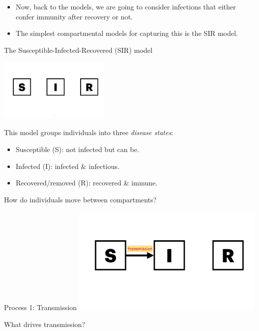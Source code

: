 \documentclass[
  ignorenonframetext,
]{beamer}
\providecommand{\tightlist}{%
  \setlength{\itemsep}{0pt}\setlength{\parskip}{0pt}}\usepackage{longtable,booktabs,array}
\begin{document}
\begin{frame}
\begin{itemize}
\tightlist
\item
  Now, back to the models, we are going to consider infections that
  either confer immunity after recovery or not.
\item
  The simplest compartmental models for capturing this is the SIR model.
\end{itemize}
\end{frame}

\begin{frame}
\begin{block}{The Susceptible-Infected-Recovered (SIR) model}
\label{the-susceptible-infected-recovered-sir-model}
\begin{center}
\includegraphics[width=0.4\textwidth,height=\textheight]{./images/model_diagrams/model_diagrams.001.jpeg}
\end{center}

This model groups individuals into three \emph{disease states}:

\begin{itemize}
\item
  {Susceptible (S)}: not infected but can be.
\item
  {Infected (I)}: infected \& infectious.
\item
  {Recovered/removed (R)}: recovered \& immune.
\end{itemize}
\end{block}
\end{frame}

\begin{frame}
\begin{block}{How do individuals move between compartments?}
\label{how-do-individuals-move-between-compartments}
\begin{block}{Process 1: Transmission}
\label{process-1-transmission}
\includegraphics[width=0.7\textwidth,height=\textheight]{images/model_diagrams/model_diagrams.002.jpeg}

{What drives transmission?}
\end{block}
\end{block}
\end{frame}
\end{document}
